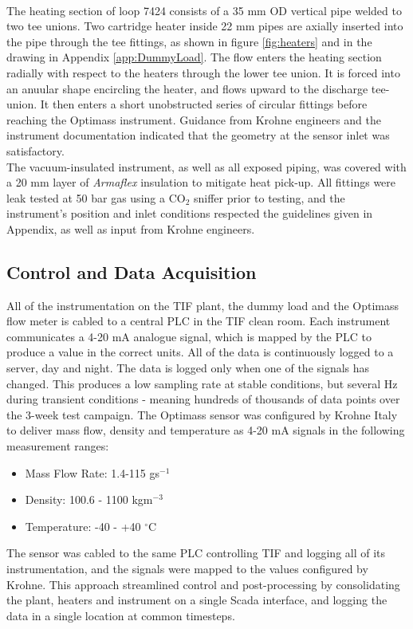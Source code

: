\documentclass{report}
\begin{document}
\\
The heating section of loop 7424 consists of a 35 mm OD vertical pipe welded to two tee unions. Two cartridge heater inside 22 mm pipes are axially inserted into the pipe through the tee fittings, as shown in figure \ref{fig:heaters} and in the drawing in Appendix \ref{app:DummyLoad}. The flow enters the heating section radially with respect to the heaters through the lower tee union. It is forced into an anuular shape encircling the heater, and flows upward to the discharge tee-union. It then enters a short unobstructed series of circular fittings before reaching the Optimass instrument. Guidance from Krohne engineers and the instrument documentation indicated that the geometry at the sensor inlet was satisfactory.\\
The vacuum-insulated instrument, as well as all exposed piping, was covered with a 20 mm layer of \textit{Armaflex} insulation to mitigate heat pick-up. All fittings were leak tested at 50 bar gas using a CO$_2$ sniffer prior to testing, and the instrument's position and inlet conditions respected the guidelines given in Appendix, as well as input from Krohne engineers. 
\FloatBarrier
\subsection{Control and Data Acquisition}
All of the instrumentation on the TIF plant, the dummy load and the Optimass flow meter is cabled to a central PLC in the TIF clean room. Each instrument communicates a 4-20 mA analogue signal, which is mapped by the PLC to produce a value in the correct units. All of the data is continuously logged to a server, day and night. The data is logged only when one of the signals has changed. This produces a low sampling rate at stable conditions, but several Hz during transient conditions - meaning hundreds of thousands of data points over the 3-week test campaign.
The Optimass sensor was configured by Krohne Italy to deliver mass flow, density and temperature as 4-20 mA signals in the following measurement ranges:\\
\begin{itemize}
\item{Mass Flow Rate: 1.4-115 gs$^{-1}$} 
\item{Density: 100.6 - 1100 kgm$^{-3}$}
\item{Temperature: -40 - +40 $^\circ$C}
\end{itemize}
The sensor was cabled to the same PLC controlling TIF and logging all of its instrumentation, and the signals were mapped to the values configured by Krohne. This approach streamlined control and post-processing by consolidating the plant, heaters and instrument on a single Scada interface, and logging the data in a single location at common timesteps. 
\end{document}
